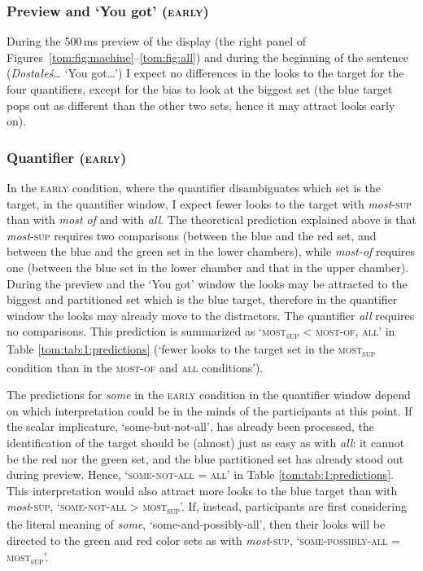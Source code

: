 \documentclass[output=paper]{langscibook}
\begin{document}

\subsubsection{Preview and `You got' (\textsc{early})}

During the 500\,ms preview of the display (the right panel of Figures~\ref{tom:fig:machine}--\ref{tom:fig:all}) and during the beginning of the sentence
(\textit{Dostałeś…} `You got…') I expect no differences in the looks to the target for the four quantifiers, except for the
bias to look at the biggest set (the blue target pops out as different than the other two sets, hence it may attract
looks early on).


\subsubsection{Quantifier (\textsc{early})}

In the \textsc{early} condition, where the quantifier disambiguates which set is the target, in the quantifier window, I expect
fewer looks to the target with \textit{most}\textsc{-sup} than with \textit{most of} and with \textit{all}. The
theoretical prediction explained above is that \textit{most}\textsc{-sup} requires two comparisons (between the blue
and the red set, and between the blue and the green set in the lower chambers), while \textit{most-of} requires one
(between the blue set in the lower chamber and that in the upper chamber). During the preview and the `You got' window
the looks may be attracted to the biggest and partitioned set which is the blue target, therefore in the quantifier
window the looks may already move to the distractors. The quantifier \textit{all} requires no comparisons. This prediction
is summarized as `\textsc{most\textsubscript{sup}} {\textless} \textsc{most-of}, \textsc{all}' in Table \ref{tom:tab:1:predictions} (`fewer looks to the target set in the \textsc{most\textsubscript{sup}} condition than in the \textsc{most-of} and \textsc{all} conditions').

The predictions for \textit{some} in the \textsc{early} condition in the quantifier window depend on which interpretation could
be in the minds of the participants at this point. If the scalar implicature, `some-but-not-all', has already
been processed, the identification of the target should be (almost) just as easy as with \textit{all}: it cannot be the
red nor the green set, and the blue partitioned set has already stood out during preview. Hence, `\textsc{some-not-all}
= \textsc{all}' in Table \ref{tom:tab:1:predictions}. This interpretation would also attract more looks to the blue target than with
\textit{most}\textsc{-sup}, `\textsc{some-not-all} {\textgreater} \textsc{most\textsubscript{sup}}'. If, instead,
participants are first considering the literal meaning of \textit{some}, `some-and-possibly-all', then their
looks will be directed to the green and red color sets as with \textit{most}\textsc{-sup},
`\textsc{some-possibly-all} = \textsc{most\textsubscript{sup}}'.
\end{document}
